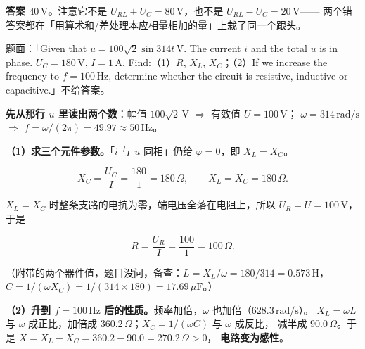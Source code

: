 \documentclass[11pt]{ctexart}
\begin{document}
\textbf{答案 $40\,\mathrm{V}$。}注意它不是 $U_{RL}+U_C=80\,\mathrm{V}$，也不是 $U_{RL}-U_C=20\,\mathrm{V}$——
两个错答案都在「用算术和/差处理本应相量相加的量」上栽了同一个跟头。


题面：「Given that $u=100\sqrt2\sin314t\,\mathrm{V}$. The current $i$ and the total $u$ is in phase.
$U_C=180\,\mathrm{V}$, $I=1\,\mathrm{A}$. Find:（1）$R$, $X_L$, $X_C$；（2）If we increase the frequency
to $f=100\,\mathrm{Hz}$, determine whether the circuit is resistive, inductive or capacitive.」不给答案。

\textbf{先从那行 $u$ 里读出两个数}：幅值 $100\sqrt2\,\mathrm{V}$ $\Longrightarrow$ 有效值 $U=100\,\mathrm{V}$；
$\omega=314\,\mathrm{rad/s}$ $\Longrightarrow$ $f=\omega/(2\pi)=49.97\approx50\,\mathrm{Hz}$。

\textbf{（1）求三个元件参数。}「$i$ 与 $u$ 同相」仍给 $\varphi=0$，即 $X_L=X_C$。

\[ X_C=\frac{U_C}{I}=\frac{180}{1}=180\,\Omega ,\qquad X_L=X_C=180\,\Omega . \]

$X_L=X_C$ 时整条支路的电抗为零，端电压全落在电阻上，所以 $U_R=U=100\,\mathrm{V}$，于是

\[ R=\frac{U_R}{I}=\frac{100}{1}=100\,\Omega . \]

（附带的两个器件值，题目没问，备查：$L=X_L/\omega=180/314=0.573\,\mathrm{H}$，
$C=1/(\omega X_C)=1/(314\times180)=17.69\,\mu\mathrm{F}$。）

\textbf{（2）升到 $f=100\,\mathrm{Hz}$ 后的性质。}频率加倍，$\omega$ 也加倍（$628.3\,\mathrm{rad/s}$）。
$X_L=\omega L$ 与 $\omega$ 成正比，加倍成 $360.2\,\Omega$；$X_C=1/(\omega C)$ 与 $\omega$ 成反比，
减半成 $90.0\,\Omega$。于是 $X=X_L-X_C=360.2-90.0=270.2\,\Omega>0$，
\textbf{电路变为感性}。


\end{document}
